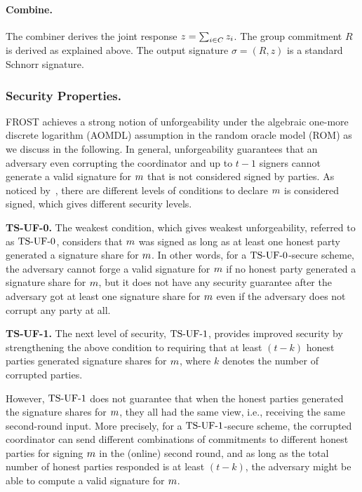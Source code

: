 \paragraph{Combine.}
The combiner derives the joint response $z = \sum_{i \in C} z_i$.
The group commitment $R$ is derived as explained above.
The output signature $\sigma = (R,z)$ is a standard Schnorr signature.

\subsubsection{Security Properties.}
FROST achieves a strong notion of unforgeability under the algebraic one-more discrete logarithm (AOMDL) assumption in the random oracle model (ROM) as we discuss in the following.
In general, unforgeability guarantees that an adversary even corrupting the coordinator and up to $t-1$ signers cannot generate a valid signature for $m$ that is not considered signed by parties. As noticed by~\cite{BellareCKMTZ22}, there are different levels of conditions to declare $m$ is considered signed, which gives different security levels.


\medskip

\textbf{TS-UF-0.} The weakest condition, which gives weakest unforgeability, referred to as $\mathrm{TS}\mbox{-}\mathrm{UF}\mbox{-}{0}$, considers that $m$ was signed as long as at least one honest party generated a signature share for $m$. In other words, for a $\mathrm{TS}\mbox{-}\mathrm{UF}\mbox{-}{0}$-secure scheme, the adversary cannot forge a valid signature for $m$ if no honest party generated a signature share for $m$, but it does not have any security guarantee after the adversary got at least one signature share for $m$ even if the adversary does not corrupt any party at all.

\medskip

\textbf{TS-UF-1.} The next level of security, $\mathrm{TS}\mbox{-}\mathrm{UF}\mbox{-}{1}$, provides improved security by strengthening the above condition to requiring that at least $(t - k)$ honest parties generated signature shares for $m$,
where $k$ denotes the number of corrupted parties.

However, $\mathrm{TS}\mbox{-}\mathrm{UF}\mbox{-}{1}$ does not guarantee that when the honest parties generated the signature shares for $m$, they all had the same view, i.e., receiving the same second-round input.
More precisely, for a $\mathrm{TS}\mbox{-}\mathrm{UF}\mbox{-}{1}$-secure scheme, the corrupted coordinator can send different combinations of commitments to different honest parties for signing $m$ in the (online) second round,
and as long as the total number of honest parties responded is at least $(t-k)$, the adversary might be able to compute a valid signature for $m$.

